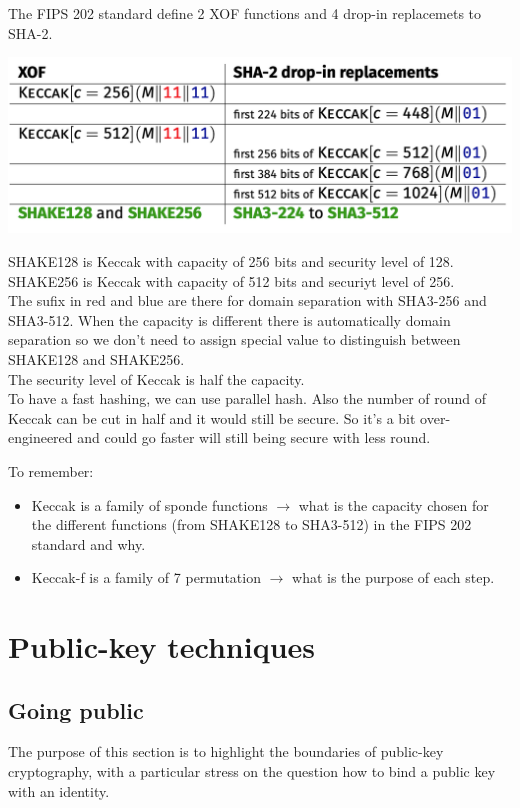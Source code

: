 \documentclass[11pt,a4paper]{report}
\begin{document}
The FIPS 202 standard define 2 XOF functions and 4 drop-in replacemets to SHA-2.
\begin{center}
\includegraphics[scale=0.5]{img/img32.png}
\end{center}
SHAKE128 is Keccak with capacity of 256 bits and security level of 128.\\ SHAKE256 is Keccak with capacity of 512 bits and securiyt level of 256. \\
The sufix in red and blue are there for domain separation with SHA3-256 and SHA3-512. When the capacity is different there is automatically domain separation so we don't need to assign special value to distinguish between SHAKE128 and SHAKE256.\\
The security level of Keccak is half the capacity.\\

To have a fast hashing, we can use parallel hash. Also the number of round of Keccak can be cut in half and it would still be secure. So it's a bit over-engineered and could go faster will still being secure with less round.

To remember:
\begin{itemize}
\item Keccak is a family of sponde functions $\longrightarrow$ what is the capacity chosen for the different functions (from SHAKE128 to SHA3-512) in the FIPS 202 standard and why.
\item Keccak-f is a family of 7 permutation $\longrightarrow$ what is the purpose of each step.
\end{itemize}

\chapter{Public-key techniques}

\section{Going public}
The purpose of this section is to highlight the boundaries of public-key cryptography, with a particular stress on the question how to bind a public key with an identity.
\end{document}
